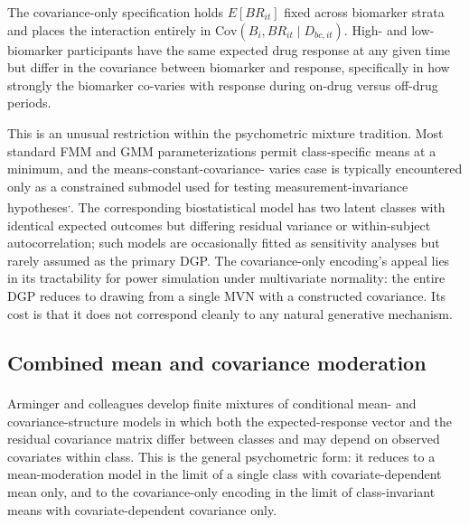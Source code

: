 \documentclass[
  11pt,
]{article}
\begin{document}
The covariance-only specification holds \(E[BR_{it}]\) fixed across
biomarker strata and places the interaction entirely in
\(\mathrm{Cov}(B_i, BR_{it} \mid D_{bc,it})\). High- and low-biomarker
participants have the same expected drug response at any given time but
differ in the covariance between biomarker and response, specifically
in how strongly the biomarker co-varies with response during on-drug
versus off-drug periods.

This is an unusual restriction within the psychometric mixture
tradition. Most standard FMM and GMM parameterizations permit
class-specific means at a minimum, and the means-constant-covariance-
varies case is typically encountered only as a constrained submodel
used for testing measurement-invariance hypotheses\textsuperscript{,}. The corresponding biostatistical model has two
latent classes with identical expected outcomes but differing residual
variance or within-subject autocorrelation; such models are
occasionally fitted as sensitivity analyses but rarely assumed as the
primary DGP. The covariance-only encoding's appeal lies in its
tractability for power simulation under multivariate normality: the
entire DGP reduces to drawing from a single MVN with a constructed
covariance. Its cost is that it does not correspond cleanly to any
natural generative mechanism.

\subsection{Combined mean and covariance moderation}\label{combined-mean-and-covariance-moderation}

Arminger and colleagues\textsuperscript{} develop finite mixtures of
conditional mean- and covariance-structure models in which both the
expected-response vector and the residual covariance matrix differ
between classes and may depend on observed covariates within class.
This is the general psychometric form: it reduces to a mean-moderation
model in the limit of a single class with covariate-dependent mean
only, and to the covariance-only encoding in the limit of
class-invariant means with covariate-dependent covariance only.
\end{document}

